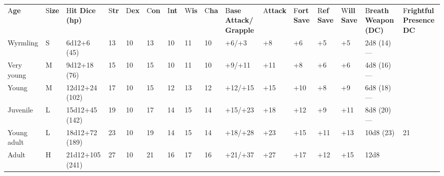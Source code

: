 \documentclass{article}
\begin{document}
\vspace{12pt}
\begin{tabular}{|>{\raggedright}p{18pt}|>{\raggedright}p{6pt}|>{\raggedright}p{18pt}|>{\raggedright}p{4pt}|>{\raggedright}p{5pt}|>{\raggedright}p{6pt}|>{\raggedright}p{4pt}|>{\raggedright}p{5pt}|>{\raggedright}p{6pt}|>{\raggedright}p{14pt}|>{\raggedright}p{10pt}|>{\raggedright}p{8pt}|>{\raggedright}p{8pt}|>{\raggedright}p{8pt}|>{\raggedright}p{16pt}|>{\raggedright}p{17pt}|}
\hline
\multicolumn{16}{|p{158pt}|}{B\textbf{lue Dragons by Age}}\tabularnewline
\hline
A{\small{}\textbf{ge}} & S{\small{}\textbf{ize}} & H{\small{}\textbf{it Dice (hp)}} & S{\small{}\textbf{tr}} & D{\small{}\textbf{ex}} & C{\small{}\textbf{on}} & I{\small{}\textbf{nt}} & W{\small{}\textbf{is}} & C{\small{}\textbf{ha}} & B{\small{}\textbf{ase 
Attack/}}\linebreak{}
{\small{}\textbf{Grapple}} & A{\small{}\textbf{ttack}} & F{\small{}\textbf{ort 
Save}} & R{\small{}\textbf{ef Save}} & W{\small{}\textbf{ill Save}} & B{\small{}\textbf{reath 
Weapon (DC)}} & F{\small{}\textbf{rightful Presence DC}}\tabularnewline
\hline
W{\small{}yrmling} & S & 6{\small{}d12+6 (45)} & 1{\small{}3} & 1{\small{}0} & 1{\small{}3} & 1{\small{}0} & 1{\small{}1} & 1{\small{}0} & +{\small{}6/+3} & +{\small{}8} & +{\small{}6} & +{\small{}5} & +{\small{}5} & 2{\small{}d8 
(14)}--- & \tabularnewline
\hline
V{\small{}ery young} & M & 9{\small{}d12+18 (76)} & 1{\small{}5} & 1{\small{}0} & 1{\small{}5} & 1{\small{}0} & 1{\small{}1} & 1{\small{}0} & +{\small{}9/+11} & +{\small{}11} & +{\small{}8} & +{\small{}6} & +{\small{}6} & 4{\small{}d8 
(16)}--- & \tabularnewline
\hline
Y{\small{}oung} & M & 1{\small{}2d12+24 (102)} & 1{\small{}7} & 1{\small{}0} & 1{\small{}5} & 1{\small{}2} & 1{\small{}3} & 1{\small{}2} & +{\small{}12/+15} & +{\small{}15} & +{\small{}10} & +{\small{}8} & +{\small{}9} & 6{\small{}d8 
(18)}--- & \tabularnewline
\hline
J{\small{}uvenile} & L & 1{\small{}5d12+45 (142)} & 1{\small{}9} & 1{\small{}0} & 1{\small{}7} & 1{\small{}4} & 1{\small{}5} & 1{\small{}4} & +{\small{}15/+23} & +{\small{}18} & +{\small{}12} & +{\small{}9} & +{\small{}11} & 8{\small{}d8 
(20)}--- & \tabularnewline
\hline
Y{\small{}oung adult} & L & 1{\small{}8d12+72 (189)} & 2{\small{}3} & 1{\small{}0} & 1{\small{}9} & 1{\small{}4} & 1{\small{}5} & 1{\small{}4} & +{\small{}18/+28} & +{\small{}23} & +{\small{}15} & +{\small{}11} & +{\small{}13} & 1{\small{}0d8 
(23)} & 2{\small{}1}\tabularnewline
\hline
A{\small{}dult} & H & 2{\small{}1d12+105 (241)} & 2{\small{}7} & 1{\small{}0} & 2{\small{}1} & 1{\small{}6} & 1{\small{}7} & 1{\small{}6} & +{\small{}21/+37} & +{\small{}27} & +{\small{}17} & +{\small{}12} & +{\small{}15} & 1{\small{}2d8 
}
\end{tabular}
\end{document}
